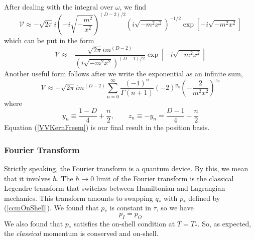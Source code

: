 After dealing with the integral over $\omega$, we find
\begin{equation}
	\mathcal{V} \approx {-\sqrt{2 \pi} i} \left(- i \sqrt{-\frac{m^{2}}{x^{2}}} \right)^{(D - 2)/2} \left( i \sqrt{-m^{2} x^{2}} \right)^{-1/2} \exp{\left[ -i \sqrt{- m^{2} x^{2}} \right]}
\end{equation}
which can be put in the form
\begin{equation}
	\mathcal{V} \approx -\frac{{\sqrt{2 \pi} i } m^{(D-2)}}{\left( i \sqrt{-m^{2} x^{2}} \right)^{(D - 1)/2}} \exp{\left[ -i \sqrt{- m^{2} x^{2}} \right]}
\end{equation}
Another useful form follows after we write the exponential as an infinite sum,
\begin{equation}
	\mathcal{V} \approx {-\sqrt{2 \pi} i } m^{(D-2)} \sum_{n = 0}^{\infty} \frac{(-1)^{n}}{\Gamma(n+1)} (-2)^{y_{n}} \left( - \frac{2}{m^{2}x^{2}} \right)^{z_{n}} \label{VVKernFreem}
\end{equation}
where
\begin{equation}
	y_{n} \equiv \frac{1 - D}{4} + \frac{n}{2}, \qquad z_{n} \equiv -y_{n} = \frac{D - 1}{4} - \frac{n}{2} 
\end{equation}
Equation (\ref{VVKernFreem}) is our final result in the position basis.
\subsubsection{Fourier Transform}
Strictly speaking, the Fourier transform is a quantum device. By this, we mean that it involves $\hbar$. The $\hbar \rightarrow 0$ limit of the Fourier transform is the classical Legendre transform that switches between Hamiltonian and Lagrangian mechanics. This transform amounts to swapping $\dot{q}_{*}$ with $p_{*}$ defined by (\ref{ccmOnShell}). We found that $p_{*}$ is constant in $\tau$, so we have
\begin{equation}
	p_{I} = p_{O}
\end{equation}
We also found that $p_{*}$ satisfies the on-shell condition at $T = T_{*}$. So, as expected, the \textit{classical} momentum is conserved and on-shell.

